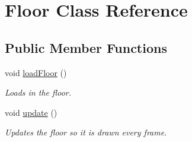 \hypertarget{classFloor}{\section{Floor Class Reference}
\label{classFloor}
}
\subsection*{Public Member Functions}
\begin{DoxyCompactItemize}
\item 
\hypertarget{classFloor_adf45852782588320c728423021f8e7ba}{void \hyperlink{classFloor_adf45852782588320c728423021f8e7ba}{load\-Floor} ()}\label{classFloor_adf45852782588320c728423021f8e7ba}

\begin{DoxyCompactList}\small\item\em Loads in the floor. \end{DoxyCompactList}\item 
\hypertarget{classFloor_a900c3f0988cf7812f0925b7e64097349}{void \hyperlink{classFloor_a900c3f0988cf7812f0925b7e64097349}{update} ()}\label{classFloor_a900c3f0988cf7812f0925b7e64097349}

\begin{DoxyCompactList}\small\item\em Updates the floor so it is drawn every frame. \end{DoxyCompactList}\end{DoxyCompactItemize}
